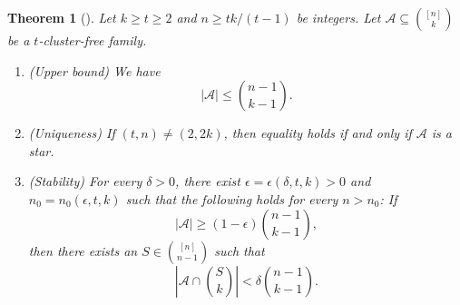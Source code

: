 \documentclass[11pt]{article}
\numberwithin{equation}{section}
\newtheorem{theorem}{Theorem}[section]
\def\A{\mathcal{A}}
\begin{document}
\begin{theorem}[\cite{Currier,Mubayi2007}]\label{dclusterEKR}
Let $k \geq   t\geq 2$ and $n\geq tk/(t-1)$ be integers.
Let $\A \subseteq \binom{[n]}{k}$ be a  $t$-cluster-free family.
\begin{enumerate}[label={\rm (\alph*)}]

\item {\rm(Upper bound)}
We have
\[
|\A|\leq\binom{n-1}{k-1}.
\]

\item {\rm(Uniqueness)}
If $(t,n)\neq(2,2k)$, then equality holds if and only if
$\A$ is a star.


\item {\rm(Stability)}
For every $\delta>0$, there exist
$\epsilon=\epsilon(\delta,t,k)>0$ and $n_0=n_0(\epsilon,t,k)$
such that the following holds for every $n>n_0$:
If
\[
|\A|\geq
(1-\epsilon)\binom{n-1}{k-1},
\]
then there exists an
$S\in\binom{[n]}{n-1}$ such that
\[
\left|\A\cap\binom{S}{k}\right|
<
\delta\binom{n-1}{k-1}.
\]

\end{enumerate}
\end{theorem}


%
%
%
%
\end{document}
